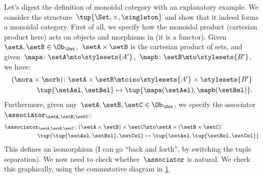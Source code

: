 
\begin{example}
  Let's digest the definition of monoidal category with an explanatory example.
  We consider the structure~$\tup{\Set,\times,\singleton}$ and show that it indeed forms a monoidal category.
  First of all, we specify how the monoidal product (cartesian product here) acts on objects and morphisms in \Set (it is a functor).
  Given~$\setA,\setB\in \Ob_{\Set}$,~$\setA\times \setB$ is the cartesian product of sets, and given~$\mapa\colon \setA\mto \stylesets{A'}$,~$\mapb\colon \setB\mto \stylesets{B'}$, we have:
  \begin{equation*}
      \label{eq:set_mon_prod_2}
    \begin{aligned}
    (\mora \times \morb)
      \colon \setA\times \setB&\mtoiso \stylesets{A'}\times \stylesets{B'}\\
      \tup{\setAel,\setBel}&\mapsto \tup{\mapa(\setAel),\mapb(\setBel)}.
    \end{aligned}
  \end{equation*}
  Furthermore, given any~$\setA,\setB,\setC\in \Ob_{\Set}$, we specify the associator~$\associator_{\setA,\setB,\setC}$:
  \begin{equation*}
      \label{eq:set_mon_prod_3}
    \begin{aligned}
      \associator_{\setA,\setB,\setC}\colon (\setA\times \setB)\times \setC&\mto \setA\times (\setB\times \setC)\\
      \tup{\tup{\setAel,\setBel},\setCel}&\mapsto \tup{\setAel,\tup{\setBel,\setCel}}
    \end{aligned}
  \end{equation*}
  This defines an isomorphism (I can go ``back and forth'', by switching the tuple separation).
  We now need to check whether~$\associator$ is natural.
  We check this graphically, using the commutative diagram in \cref{fig:monoidal_set_ass_nat}.

  \begin{figure}[h!]
    \begin{center}
    \end{center}
    \caption{\label{fig:monoidal_set_ass_nat}}
  \end{figure}


\end{example}
